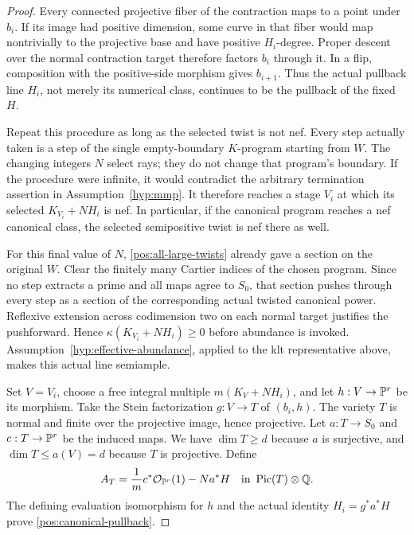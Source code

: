\begin{proof}
Every connected projective fiber of the contraction maps to a point
under \(b_i\). If its image had positive dimension, some curve in that
fiber would map nontrivially to the projective base and have positive
\(H_i\)-degree. Proper descent over the normal contraction target
therefore factors \(b_i\) through it. In a flip, composition with the
positive-side morphism gives \(b_{i+1}\). Thus the actual pullback line
\(H_i\), not merely its numerical class, continues to be the pullback
of the fixed \(H\).

Repeat this procedure as long as the selected twist is not nef.
Every step actually taken is a step of the single empty-boundary
\(K\)-program starting from \(W\). The changing integers \(N\)
select rays; they do not change that program's boundary. If the
procedure were infinite, it would contradict the arbitrary termination
assertion in Assumption~\ref{hyp:mmp}. It therefore reaches a stage
\(V_i\) at which its selected \(K_{V_i}+NH_i\) is nef. In particular,
if the canonical program reaches a nef canonical class, the selected
semipositive twist is nef there as well.

For this final value of \(N\), \eqref{pos:all-large-twists} already
gave a section on the original \(W\). Clear the finitely many Cartier
indices of the chosen program. Since no step extracts a prime and all
maps agree to \(S_0\), that section pushes through every step as a
section of the corresponding actual twisted canonical power.
Reflexive extension across codimension two on each normal target
justifies the pushforward. Hence
\(\kappa(K_{V_i}+NH_i)\geq0\) before abundance is invoked.
Assumption~\ref{hyp:effective-abundance}, applied to the klt
representative above, makes this actual line semiample.

Set \(V=V_i\), choose a free integral multiple
\(m(K_V+NH_i)\), and let \(h:V\to\mathbb{P}^r\) be its morphism.
Take the Stein factorization \(g:V\to T\) of \((b_i,h)\).
The variety \(T\) is normal and finite over the projective image,
hence projective. Let \(a:T\to S_0\) and \(c:T\to\mathbb{P}^r\) be the
induced maps. We have \(\dim T\geq d\) because \(a\) is surjective,
and \(\dim T\leq a(V)=d\) because \(T\) is projective. Define
\begin{equation}\label{pos:actual-base-line}
 A_T=\frac1m c^*\mathcal{O}_{\mathbb{P}^r}(1)-N a^*H
 \quad\text{in }\operatorname{Pic}(T)\otimes\mathbb{Q}.
\end{equation}
The defining evaluation isomorphism for \(h\) and the actual identity
\(H_i=g^*a^*H\) prove \eqref{pos:canonical-pullback}.
\end{proof}

